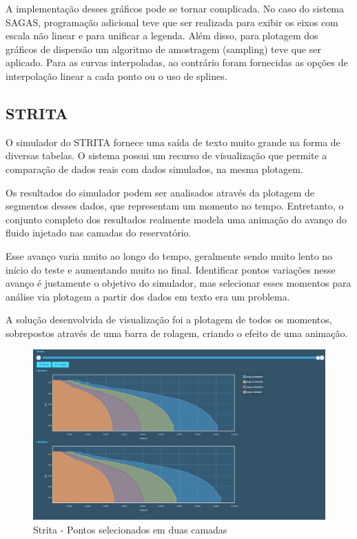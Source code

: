 \documentclass[]{article}
\begin{document}
A implementação desses gráficos pode se tornar complicada. No caso do sistema SAGAS, programação adicional teve que ser realizada para exibir os eixos com escala não linear e para unificar a legenda. Além disso, para plotagem dos gráficos de dispersão um algoritmo de amostragem (sampling) teve que ser aplicado. Para as curvas interpoladas, ao contrário foram fornecidas as opções de interpolação linear a cada ponto ou o uso de splines. 
 
\subsection{STRITA}

O simulador do STRITA fornece uma saída de texto muito grande na forma de diversas tabelas. O sistema possui um recurso de visualização que permite a comparação de dados reais com dados simulados, na mesma plotagem.

Os resultados do simulador podem ser analisados através da plotagem de segmentos desses dados, que representam um momento no tempo. Entretanto, o conjunto completo dos resultados realmente modela uma animação do avanço do fluido injetado nas camadas do reservatório. 

Esse avanço varia muito ao longo do tempo, geralmente sendo muito lento no início do teste e aumentando muito no final. Identificar pontos variações nesse avanço é justamente o objetivo do simulador, mas selecionar esses momentos para análise via plotagem a partir dos dados em texto era um problema.

A solução desenvolvida de visualização foi a plotagem de todos os momentos, sobrepostos através de uma barra de rolagem, criando o efeito de uma animação.

\begin{figure}[!ht]
\centering
\includegraphics[scale=0.3]{./strita_frentes}
\caption{Strita - Pontos selecionados em duas camadas}
\label{fig:strita_frentes}
\end{figure}
\end{document}
